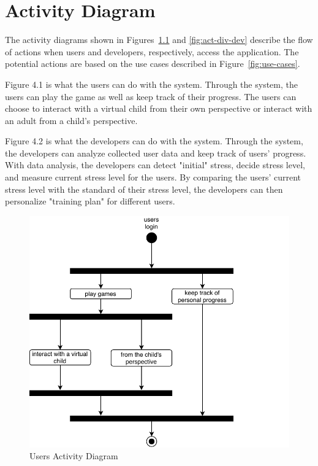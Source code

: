 \chapter{Activity Diagram} %

The activity diagrams shown in Figures~\ref{fig:act-div-usr} and \ref{fig:act-div-dev} describe the flow of actions when users and developers, respectively, access the application. The potential actions are based on the use cases described in Figure~\ref{fig:use-cases}.

Figure 4.1 is what the users can do with the system.
Through the system, the users can play the game as well as keep track of their progress. The users can choose to interact with a virtual child from their own perspective or interact with an adult from a child's perspective. 


Figure 4.2 is what the developers can do with the system.
Through the system, the developers can analyze collected user data and keep track of users' progress. With data analysis, the developers can detect "initial" stress, decide stress level, and measure current stress level for the users. By comparing the users' current stress level with the standard of their stress level, the developers can then personalize "training plan" for different users. 


\begin{figure}[h]
    \centering
    \includegraphics[width=0.75\linewidth]{activity-diagram-users}
    \caption{Users Activity Diagram}
    \label{fig:act-div-usr}
\end{figure}

